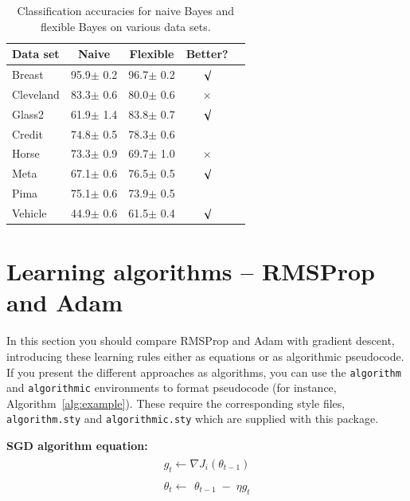 \documentclass{article}
\begin{document}
\begin{table}[tb]
\vskip 3mm
\begin{center}
\begin{small}
\begin{sc}
\begin{tabular}{lcccr}
\hline
\abovespace\belowspace
Data set & Naive & Flexible & Better? \\
\hline
\abovespace
Breast    & 95.9$\pm$ 0.2& 96.7$\pm$ 0.2& $\surd$ \\
Cleveland & 83.3$\pm$ 0.6& 80.0$\pm$ 0.6& $\times$\\
Glass2    & 61.9$\pm$ 1.4& 83.8$\pm$ 0.7& $\surd$ \\
Credit    & 74.8$\pm$ 0.5& 78.3$\pm$ 0.6&         \\
Horse     & 73.3$\pm$ 0.9& 69.7$\pm$ 1.0& $\times$\\
Meta      & 67.1$\pm$ 0.6& 76.5$\pm$ 0.5& $\surd$ \\
Pima      & 75.1$\pm$ 0.6& 73.9$\pm$ 0.5&         \\
\belowspace
Vehicle   & 44.9$\pm$ 0.6& 61.5$\pm$ 0.4& $\surd$ \\
\hline
\end{tabular}
\end{sc}
\end{small}
\caption{Classification accuracies for naive Bayes and flexible 
Bayes on various data sets.}
\label{tab:sample-table}
\end{center}
\vskip -3mm
\end{table}





\section{Learning algorithms -- RMSProp and Adam}
In this section you should compare RMSProp and Adam with gradient descent, introducing these learning rules either as equations or as algorithmic pseudocode.  If you present the different approaches as algorithms, you can use the \verb+algorithm+ and \verb+algorithmic+ environments to format pseudocode (for instance, Algorithm~\ref{alg:example}). These require the corresponding style files, \verb+algorithm.sty+ and \verb+algorithmic.sty+ which are supplied with this package. 

\textbf{SGD algorithm equation:}
\begin{equation}
\begin{aligned}
\begin{array}{l}g_t\leftarrow\nabla J_i\left(\theta_{t-1}\right)\end{array}\\
\begin{array}{l}\theta_t\leftarrow\end{array}\theta_{t-1}\;-\;\eta g_t
\end{aligned}
\end{equation}
\end{document}
